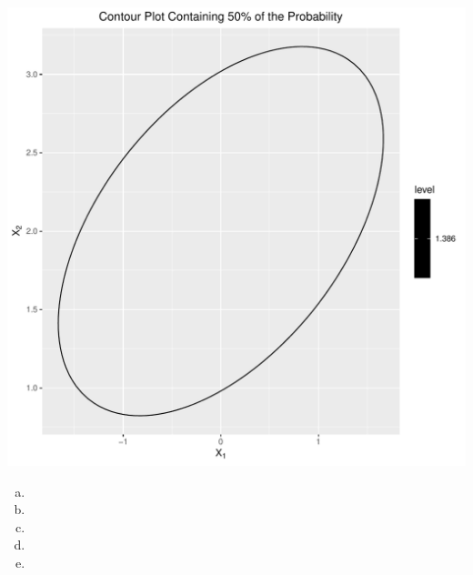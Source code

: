 \documentclass[12pt]{article}\usepackage[]{graphicx}\usepackage[]{color}
\makeatletter
\def\maxwidth{ %
  \ifdim\Gin@nat@width>\linewidth
    \linewidth
  \else
    \Gin@nat@width
  \fi
}
\newenvironment{knitrout}{}{} %
\newenvironment{problem}[2][Problem]{\begin{trivlist}
\item[\hskip \labelsep {\bfseries #1}\hskip \labelsep {\bfseries #2.}]}{\end{trivlist}}
\makeatother
\begin{document}
\begin{enumerate}[a)]
\begin{knitrout}
\color{fgcolor}
\includegraphics[width=\maxwidth]{figure/unnamed-chunk-2-1} 

\end{knitrout}

\end{enumerate}

\begin{problem}{4.3}
\end{problem}

\begin{enumerate}[a)]

\item

\item

\item

\item

\item

\end{enumerate}

\begin{problem}{4.4}
\end{problem}

\begin{problem}{4.5}
\end{problem}
\end{document}
